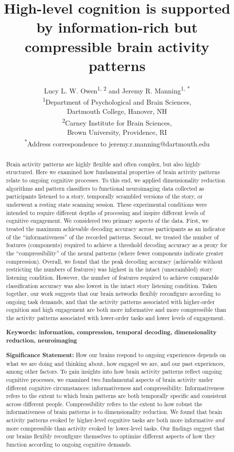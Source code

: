 \documentclass[english, 11pt]{article}
\title{High-level cognition is supported by information-rich but compressible brain activity patterns}
\author{Lucy L. W. Owen\textsuperscript{1, 2} and Jeremy R. Manning\textsuperscript{1,
*}\\\textsuperscript{1}Department of Psychological and Brain Sciences,\\Dartmouth College,
Hanover, NH\\[0.1cm]\textsuperscript{2}Carney Institute for Brain Sciences,\\Brown University,
Providence, RI\\[0.1cm] \textsuperscript{*}Address correspondence to
jeremy.r.manning@dartmouth.edu}
\begin{document}
\maketitle


\begin{abstract} 
  
Brain activity patterns are highly flexible and often complex, but also highly
structured. Here we examined how fundamental properties of brain activity
patterns relate to ongoing cognitive processes. To this end, we applied
dimensionality reduction algorithms and pattern classifiers to functional
neuroimaging data collected as participants listened to a story, temporally
scrambled versions of the story, or underwent a resting state scanning session.
These experimental conditions were intended to require different depths of
processing and inspire different levels of cognitive engagement. We considered
two primary aspects of the data. First, we treated the maximum achievable
decoding accuracy across participants as an indicator of the
``informativeness'' of the recorded patterns. Second, we treated the number of
features (components) required to achieve a threshold decoding accuracy as a
proxy for the ``compressibility'' of the neural patterns (where fewer
components indicate greater compression). Overall, we found that the peak
decoding accuracy (achievable without restricting the numbers of features) was
highest in the intact (unscrambled) story listening condition. However, the
number of features required to achieve comparable classification accuracy was
also lowest in the intact story listening condition. Taken together, our work
suggests that our brain networks flexibly reconfigure according to ongoing task
demands, and that the activity patterns associated with higher-order cognition
and high engagement are both more informative and more compressible than the
activity patterns associated with lower-order tasks and lower levels of
engagement.

\bigskip
\noindent
\textbf{Keywords: information, compression, temporal decoding, dimensionality
reduction, neuroimaging}

\bigskip 
\noindent 

\textbf{Significance Statement:} How our brains respond to ongoing experiences
depends on what we are doing and thinking about, how engaged we are, and our
past experiences, among other factors. To gain insights into how brain activity
patterns reflect ongoing cognitive processes, we examined two fundamental
aspects of brain activity under different cognitive circumstances:
informativeness and compressibility. Informativeness refers to the extent to
which brain patterns are both temporally specific and consistent across
different people. Compressibility refers to the extent to how robust the
informativeness of brain patterns is to dimensionality reduction. We found that
brain activity patterns evoked by higher-level cognitive tasks are both more
informative \textit{and} more compressible than activity evoked by lower-level
tasks. Our findings suggest that our brains flexibly reconfigure themselves to
optimize different aspects of how they function according to ongoing cognitive
demands.

\end{abstract}
\end{document}
